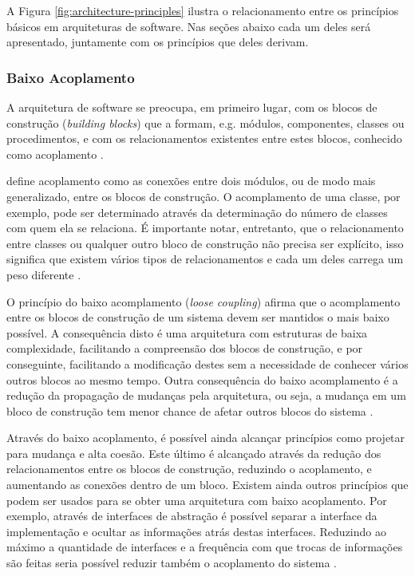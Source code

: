 \documentclass[diss]{template/setrem}
\begin{document}
A Figura \ref{fig:architecture-principles} ilustra o relacionamento entre os princípios básicos em arquiteturas de software. Nas seções abaixo cada um deles será apresentado, juntamente com os princípios que deles derivam.

\subsubsection{Baixo Acoplamento}
A arquitetura de software se preocupa, em primeiro lugar, com os blocos de construção (\emph{building blocks}) que a formam, e.g. módulos, componentes, classes ou procedimentos, e com os relacionamentos existentes entre estes blocos, conhecido como acoplamento \citep{Vogel2011}.

\citet{Albin2003} define acoplamento como as conexões entre dois módulos, ou de modo mais generalizado, entre os blocos de construção. O acomplamento de uma classe, por exemplo, pode ser determinado através da determinação do número de classes com quem ela se relaciona. É importante notar, entretanto, que o relacionamento entre classes ou qualquer outro bloco de construção não precisa ser explícito, isso significa que existem vários tipos de relacionamentos e cada um deles carrega um peso diferente \citep{Vogel2011}.

O princípio do baixo acomplamento (\emph{loose coupling}) afirma que o acomplamento entre os blocos de construção de um sistema devem ser mantidos o mais baixo possível. A consequência disto é uma arquitetura com estruturas de baixa complexidade, facilitando a compreensão dos blocos de construção, e por conseguinte, facilitando a modificação destes sem a necessidade de conhecer vários outros blocos ao mesmo tempo. Outra consequência do baixo acomplamento é a redução da propagação de mudanças pela arquitetura, ou seja, a mudança em um bloco de construção tem menor chance de afetar outros blocos do sistema \citep{Vogel2011}.

Através do baixo acoplamento, é possível ainda alcançar princípios como projetar para mudança e alta coesão. Este último é alcançado através da redução dos relacionamentos entre os blocos de construção, reduzindo o acoplamento, e aumentando as conexões dentro de um bloco. Existem ainda outros princípios que podem ser usados para se obter uma arquitetura com baixo acoplamento. Por exemplo, através de interfaces de abstração é possível separar a interface da implementação e ocultar as informações atrás destas interfaces. Reduzindo ao máximo a quantidade de interfaces e a frequência com que trocas de informações são feitas seria possível reduzir também o acoplamento do sistema \citep{Vogel2011}.
\end{document}
